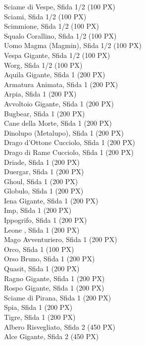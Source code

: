 \begin{multicols}{3}
{		Sciame di Vespe, Sfida 1/2 (100 PX)\\
		Sciami, Sfida 1/2 (100 PX)\\
		Scimmione, Sfida 1/2 (100 PX)\\
		Squalo Corallino, Sfida 1/2 (100 PX)\\
		Uomo Magma (Magmin), Sfida 1/2 (100 PX)\\
		Vespa Gigante, Sfida 1/2 (100 PX)\\
		Worg, Sfida 1/2 (100 PX)\\
		Aquila Gigante, Sfida 1 (200 PX)\\
		Armatura Animata, Sfida 1 (200 PX)\\
		Arpia, Sfida 1 (200 PX)\\
		Avvoltoio Gigante, Sfida 1 (200 PX)\\
		Bugbear, Sfida 1 (200 PX)\\
		Cane della Morte, Sfida 1 (200 PX)\\
		Dinolupo (Metalupo), Sfida 1 (200 PX)\\
		Drago d'Ottone Cucciolo, Sfida 1 (200 PX)\\
		Drago di Rame Cucciolo, Sfida 1 (200 PX)\\
		Driade, Sfida 1 (200 PX)\\
		Duergar, Sfida 1 (200 PX)\\
		Ghoul, Sfida 1 (200 PX)\\
		Globulo, Sfida 1 (200 PX)\\
		Iena Gigante, Sfida 1 (200 PX)\\
		Imp, Sfida 1 (200 PX)\\
		Ippogrifo, Sfida 1 (200 PX)\\
		Leone  , Sfida 1 (200 PX)\\
		Mago Avventuriero, Sfida 1 (200 PX)\\
		Orco, Sfida 1 (100 PX)\\
		Orso Bruno, Sfida 1 (200 PX)\\
		Quasit, Sfida 1 (200 PX)\\
		Ragno Gigante, Sfida 1 (200 PX)\\
		Rospo Gigante, Sfida 1 (200 PX)\\
		Sciame di Pirana, Sfida 1 (200 PX)\\
		Spia, Sfida 1 (200 PX)\\
		Tigre, Sfida 1 (200 PX)\\
		Albero Risvegliato, Sfida 2 (450 PX)\\
		Alce Gigante, Sfida 2 (450 PX)\\
}
\end{multicols}
